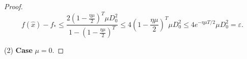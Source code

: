 \documentclass{article} %
\numberwithin{equation}{section}
\begin{document}
\begin{proof}
    \begin{equation}
        f(\hat{x})-f_* \leq \frac{2(1-\frac{\eta\mu}{2})^T\mu D_0^2}{1-(1-\frac{\eta\mu}{2})^T}\leq 4(1-\frac{\eta\mu}{2})^T\mu D_0^2\leq 4e^{-\eta\mu T/2}\mu D_0^2=\varepsilon.
    \end{equation}

    (2) \textbf{Case} $\mu=0$.


\end{proof}
\end{document}
